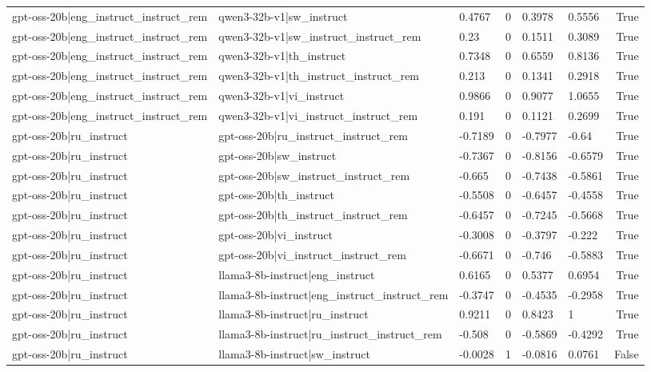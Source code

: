 \begin{table}
\begin{tabular}{llllllr}
gpt-oss-20b|eng_instruct_instruct_rem & qwen3-32b-v1|sw_instruct & 0.4767 & 0 & 0.3978 & 0.5556 & True \\
gpt-oss-20b|eng_instruct_instruct_rem & qwen3-32b-v1|sw_instruct_instruct_rem & 0.23 & 0 & 0.1511 & 0.3089 & True \\
gpt-oss-20b|eng_instruct_instruct_rem & qwen3-32b-v1|th_instruct & 0.7348 & 0 & 0.6559 & 0.8136 & True \\
gpt-oss-20b|eng_instruct_instruct_rem & qwen3-32b-v1|th_instruct_instruct_rem & 0.213 & 0 & 0.1341 & 0.2918 & True \\
gpt-oss-20b|eng_instruct_instruct_rem & qwen3-32b-v1|vi_instruct & 0.9866 & 0 & 0.9077 & 1.0655 & True \\
gpt-oss-20b|eng_instruct_instruct_rem & qwen3-32b-v1|vi_instruct_instruct_rem & 0.191 & 0 & 0.1121 & 0.2699 & True \\
gpt-oss-20b|ru_instruct & gpt-oss-20b|ru_instruct_instruct_rem & -0.7189 & 0 & -0.7977 & -0.64 & True \\
gpt-oss-20b|ru_instruct & gpt-oss-20b|sw_instruct & -0.7367 & 0 & -0.8156 & -0.6579 & True \\
gpt-oss-20b|ru_instruct & gpt-oss-20b|sw_instruct_instruct_rem & -0.665 & 0 & -0.7438 & -0.5861 & True \\
gpt-oss-20b|ru_instruct & gpt-oss-20b|th_instruct & -0.5508 & 0 & -0.6457 & -0.4558 & True \\
gpt-oss-20b|ru_instruct & gpt-oss-20b|th_instruct_instruct_rem & -0.6457 & 0 & -0.7245 & -0.5668 & True \\
gpt-oss-20b|ru_instruct & gpt-oss-20b|vi_instruct & -0.3008 & 0 & -0.3797 & -0.222 & True \\
gpt-oss-20b|ru_instruct & gpt-oss-20b|vi_instruct_instruct_rem & -0.6671 & 0 & -0.746 & -0.5883 & True \\
gpt-oss-20b|ru_instruct & llama3-8b-instruct|eng_instruct & 0.6165 & 0 & 0.5377 & 0.6954 & True \\
gpt-oss-20b|ru_instruct & llama3-8b-instruct|eng_instruct_instruct_rem & -0.3747 & 0 & -0.4535 & -0.2958 & True \\
gpt-oss-20b|ru_instruct & llama3-8b-instruct|ru_instruct & 0.9211 & 0 & 0.8423 & 1 & True \\
gpt-oss-20b|ru_instruct & llama3-8b-instruct|ru_instruct_instruct_rem & -0.508 & 0 & -0.5869 & -0.4292 & True \\
gpt-oss-20b|ru_instruct & llama3-8b-instruct|sw_instruct & -0.0028 & 1 & -0.0816 & 0.0761 & False \\

\end{tabular}
\end{table}
